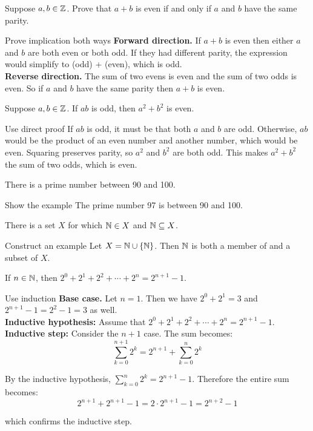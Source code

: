 \documentclass{article}
\begin{document}
\begin{problem}
Suppose $a,b\in\mathbb{Z}$. Prove that $a+b$ is even if and only if $a$ and $b$ have the same parity.
\end{problem}
\begin{solution}{Prove implication both ways}
    \textbf{Forward direction.} If $a + b$ is even then either $a$ and $b$ are both even or both odd. If they had different parity, the expression would simplify to (odd)  + (even), which is odd.
    \\
    \textbf{Reverse direction.} The sum of two evens is even and the sum of two odds is even. So if $a$ and $b$ have the same parity then $a + b$ is even.
\end{solution}

\begin{problem}
Suppose $a,b\in\mathbb{Z}$. If $ab$ is odd, then $a^2 + b^2$ is even.
\end{problem}
\begin{solution}{Use direct proof}
    If $ab$ is odd, it must be that both $a$ and $b$ are odd. Otherwise, $ab$ would be the product of an even number and another number, which would be even. Squaring preserves parity, so $a^2$ and $b^2$ are both odd. This makes $a^2 + b^2$ the sum of two odds, which is even.
\end{solution}

\begin{problem}
There is a prime number between 90 and 100.
\end{problem}
\begin{solution}{Show the example}
    The prime number 97 is between 90 and 100.
\end{solution}

\begin{problem}
There is a set $X$ for which $\mathbb{N} \in X$ and $\mathbb{N} \subseteq X$.
\end{problem}
\begin{solution}{Construct an example}
    Let $X = \mathbb{N} \cup \{\mathbb{N}\}$. Then $\mathbb{N}$ is both a member of and a subset of $X$.
\end{solution}

\begin{problem}
If $n\in\mathbb{N}$, then $2^0 + 2^1 + 2^2 + \cdots + 2^n = 2^{n+1} - 1$.
\end{problem}
\begin{solution}{Use induction}
    \textbf{Base case.} Let $n = 1$. Then we have $2^0 + 2^1 = 3$ and  $2^{n+1} - 1 = 2^2 - 1 = 3$ as well.
    \\

    \textbf{Inductive hypothesis:} Assume that $2^0 + 2^1 + 2^2 + \cdots + 2^n = 2^{n+1} - 1$.
    \\

    \textbf{Inductive step:} Consider the $n+1$ case. The sum becomes:
    $$\sum_{k=0}^{n+1} 2^k = 2^{n+1} + \sum_{k=0}^{n} 2^k$$

    By the inductive hypothesis, $\sum\limits_{k=0}^{n} 2^k = 2^{n+1} - 1$. Therefore the entire sum becomes:
    $$2^{n+1} + 2^{n+1} - 1 = 2\cdot 2^{n+1} - 1 = 2^{n+2} - 1$$

    which confirms the inductive step.

\end{solution}
\end{document}
